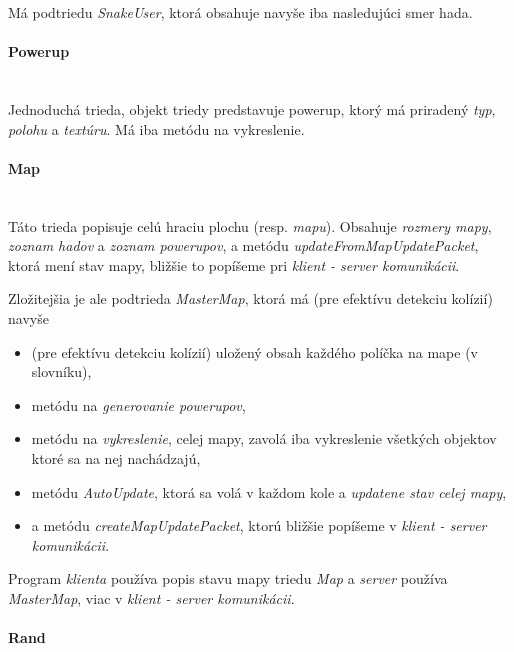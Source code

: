 \documentclass{article}
\begin{document}
\medskip
Má podtriedu \textit{SnakeUser}, ktorá obsahuje navyše iba nasledujúci smer hada.

\paragraph{Powerup}\mbox{} \\

Jednoduchá trieda, objekt triedy predstavuje powerup, ktorý má priradený \textit{typ}, \textit{polohu} a \textit{textúru}. Má iba metódu na vykreslenie.

\paragraph{Map}\mbox{} \\

Táto trieda popisuje celú hraciu plochu (resp. \textit{mapu}). Obsahuje \textit{rozmery mapy}, \textit{zoznam hadov} a \textit{zoznam powerupov}, a metódu \textit{updateFromMapUpdatePacket}, ktorá mení stav mapy, bližšie to popíšeme pri \textit{klient - server komunikácii}.

\medskip
Zložitejšia je ale podtrieda \textit{MasterMap}, ktorá má (pre efektívu detekciu kolízií) navyše 

\begin{itemize}
    \item (pre efektívu detekciu kolízií) uložený obsah každého políčka na mape (v slovníku),
    \item metódu na \textit{generovanie powerupov},
    \item metódu na \textit{vykreslenie}, celej mapy, zavolá iba vykreslenie všetkých objektov ktoré sa na nej nachádzajú,
    \item metódu \textit{AutoUpdate}, ktorá sa volá v každom kole a \textit{updatene stav celej mapy},
    \item a metódu \textit{createMapUpdatePacket}, ktorú bližšie popíšeme v \textit{klient - server komunikácii}.
\end{itemize}

Program \textit{klienta} používa popis stavu mapy triedu \textit{Map} a \textit{server} používa \textit{MasterMap}, viac v \textit{klient - server komunikácii}.

\paragraph{Rand}\mbox{} \\
\end{document}
